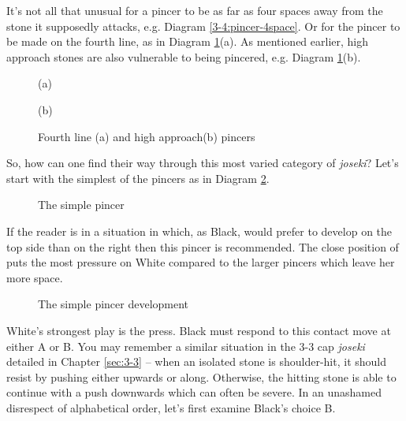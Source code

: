 \documentclass[a5paper,12pt,twoside]{book} %
\newcounter{joseki}                 %
\newcommand{\dref}[1]{Diagram \ref{#1}}
\begin{document}
It's not all that unusual for a pincer to be as far as four spaces away from the stone it supposedly attacks, e.g. \dref{3-4:pincer-4space}. Or for the pincer to be made on the fourth line, as in \dref{3-4:pincers}(a). As mentioned earlier, high approach stones are also vulnerable to being pincered, e.g. \dref{3-4:pincers}(b).\\

\begin{figure}[!h]
\begin{minipage}[b][][b]{.5\textwidth}
\centering

\vspace{-0.6cm} (a)
\end{minipage}%
\begin{minipage}[b][][b]{0.5\textwidth}
\centering

\vspace{-0.6cm} (b)
\end{minipage}
\vspace{-0.3cm}\caption{Fourth line (a) and high approach(b) pincers}
\label{3-4:pincers}
\end{figure}

So, how can one find their way through this most varied category of \textit{joseki}? Let's start with the simplest of the pincers as in \dref{3-4:pincer-simple}.\\

\begin{figure}[!h]
 
\vspace{-0.6cm}\caption{The simple pincer}
\label{3-4:pincer-simple}
\end{figure}

If the reader is in a situation in which, as Black, would prefer to develop on the top side than on the right then this pincer is recommended. The close position of{\large\blackstone[2]} puts the most pressure on White compared to the larger pincers which leave her more space.\\

\begin{figure}[!htbp]
 
\vspace{-0.6cm}\caption{The simple pincer development}
\label{3-4:pincer-simple-options}
\end{figure}

White's strongest play is the press{\large\whitestone[3]}. Black must respond to this contact move at either A or B. You may remember a similar situation in the 3-3 cap \textit{joseki} detailed in Chapter \ref{sec:3-3} – when an isolated stone is shoulder-hit, it should resist by pushing either upwards or along. Otherwise, the hitting stone is able to continue with a push downwards which can often be severe. In an unashamed disrespect of alphabetical order, let's first examine Black's choice B.\\
\end{document}
